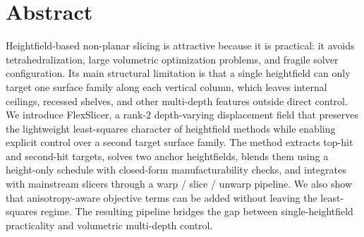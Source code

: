 \section*{Abstract}

Heightfield-based non-planar slicing is attractive because it is practical: it avoids tetrahedralization, large volumetric optimization problems, and fragile solver configuration. Its main structural limitation is that a single heightfield can only target one surface family along each vertical column, which leaves internal ceilings, recessed shelves, and other multi-depth features outside direct control. We introduce FlexSlicer, a rank-2 depth-varying displacement field that preserves the lightweight least-squares character of heightfield methods while enabling explicit control over a second target surface family. The method extracts top-hit and second-hit targets, solves two anchor heightfields, blends them using a height-only schedule with closed-form manufacturability checks, and integrates with mainstream slicers through a warp / slice / unwarp pipeline. We also show that anisotropy-aware objective terms can be added without leaving the least-squares regime. The resulting pipeline bridges the gap between single-heightfield practicality and volumetric multi-depth control.
